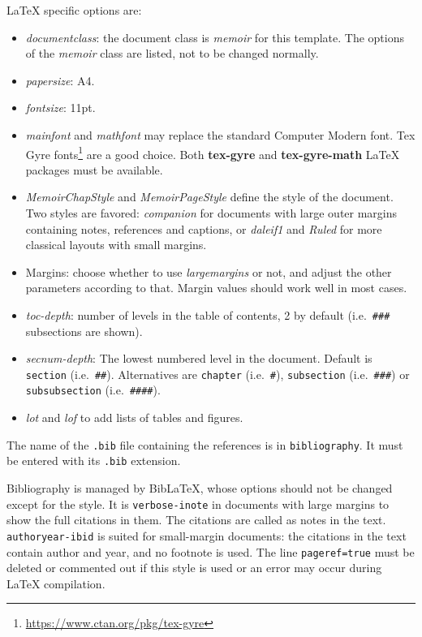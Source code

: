\documentclass[
  12pt,
  american,
  a4paper,
  extrafontsizes,onecolumn,openright
  ]{memoir}
\providecommand{\tightlist}{%
  \setlength{\itemsep}{0pt}\setlength{\parskip}{0pt}}
\begin{document}
LaTeX specific options are:

\begin{itemize}
\tightlist
\item
  \emph{documentclass}: the document class is \emph{memoir} for this template.
  The options of the \emph{memoir} class are listed, not to be changed normally.
\item
  \emph{papersize}: A4.
\item
  \emph{fontsize}: 11pt.
\item
  \emph{mainfont} and \emph{mathfont} may replace the standard Computer Modern font.
  Tex Gyre fonts\footnote{\url{https://www.ctan.org/pkg/tex-gyre}} are a good choice.
  Both \textbf{tex-gyre} and \textbf{tex-gyre-math} LaTeX packages must be available.
\item
  \emph{MemoirChapStyle} and \emph{MemoirPageStyle} define the style of the document.
  Two styles are favored: \emph{companion} for documents with large outer margins containing notes, references and captions, or \emph{daleif1} and \emph{Ruled} for more classical layouts with small margins.
\item
  Margins: choose whether to use \emph{largemargins} or not, and adjust the other parameters according to that.
  Margin values should work well in most cases.
\item
  \emph{toc-depth}: number of levels in the table of contents, 2 by default (i.e.~\texttt{\#\#\#} subsections are shown).
\item
  \emph{secnum-depth}: The lowest numbered level in the document. Default is \texttt{section} (i.e.~\texttt{\#\#}).
  Alternatives are \texttt{chapter} (i.e.~\texttt{\#}), \texttt{subsection} (i.e.~\texttt{\#\#\#}) or \texttt{subsubsection} (i.e.~\texttt{\#\#\#\#}).
\item
  \emph{lot} and \emph{lof} to add lists of tables and figures.
\end{itemize}

The name of the \texttt{.bib} file containing the references is in \texttt{bibliography}.
It must be entered with its \texttt{.bib} extension.

Bibliography is managed by BibLaTeX, whose options should not be changed except for the style.
It is \texttt{verbose-inote} in documents with large margins to show the full citations in them.
The citations are called as notes in the text.
\texttt{authoryear-ibid} is suited for small-margin documents: the citations in the text contain author and year, and no footnote is used.
The line \texttt{pageref=true} must be deleted or commented out if this style is used or an error may occur during LaTeX compilation.
\end{document}
